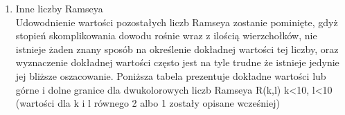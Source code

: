 \documentclass[11pt]{article}
\begin{document}
\begin{enumerate}
\item Inne liczby Ramseya \hfill \\

 Udowodnienie wartości pozostałych liczb Ramseya zostanie pominięte, gdyż stopień skomplikowania dowodu rośnie wraz z ilością wierzchołków, nie istnieje żaden znany sposób na określenie dokładnej wartości tej liczby, oraz wyznaczenie dokładnej wartości często jest na tyle trudne że istnieje jedynie jej bliższe oszacowanie. Poniższa tabela prezentuje dokładne wartości lub górne i dolne granice dla dwukolorowych liczb Ramseya R(k,l) k<10, l<10 (wartości dla k i l równego 2 albo 1 zostały opisane wcześniej)
 
\hfill 

\end{enumerate}
\end{document}
